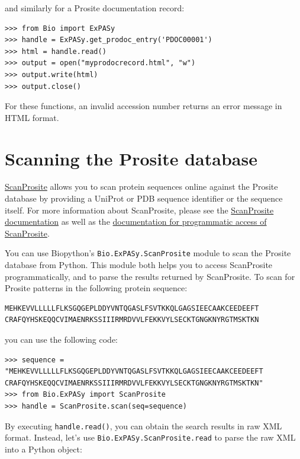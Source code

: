 \documentclass{report}
\begin{document}
and similarly for a Prosite documentation record:

\begin{verbatim}
>>> from Bio import ExPASy
>>> handle = ExPASy.get_prodoc_entry('PDOC00001')
>>> html = handle.read()
>>> output = open("myprodocrecord.html", "w")
>>> output.write(html)
>>> output.close()
\end{verbatim}

For these functions, an invalid accession number returns an error message in HTML format.

\section{Scanning the Prosite database}

\href{http://www.expasy.org/tools/scanprosite/}{ScanProsite} allows you to scan protein sequences online against the Prosite database by providing a UniProt or PDB sequence identifier or the sequence itself. For more information about ScanProsite, please see the \href{http://www.expasy.org/tools/scanprosite/scanprosite-doc.html}{ScanProsite documentation} as well as the \href{http://www.expasy.org/tools/scanprosite/ScanPrositeREST.html}{documentation for programmatic access of ScanProsite}.

You can use Biopython's \verb+Bio.ExPASy.ScanProsite+ module to scan the Prosite database from Python. This module both helps you to access ScanProsite programmatically, and to parse the results returned by ScanProsite. To scan for Prosite patterns in the following protein sequence:

\begin{verbatim}
MEHKEVVLLLLLFLKSGQGEPLDDYVNTQGASLFSVTKKQLGAGSIEECAAKCEEDEEFT
CRAFQYHSKEQQCVIMAENRKSSIIIRMRDVVLFEKKVYLSECKTGNGKNYRGTMSKTKN
\end{verbatim}

you can use the following code:

\begin{verbatim}
>>> sequence = "MEHKEVVLLLLLFLKSGQGEPLDDYVNTQGASLFSVTKKQLGAGSIEECAAKCEEDEEFT
CRAFQYHSKEQQCVIMAENRKSSIIIRMRDVVLFEKKVYLSECKTGNGKNYRGTMSKTKN"
>>> from Bio.ExPASy import ScanProsite
>>> handle = ScanProsite.scan(seq=sequence)
\end{verbatim}

By executing \verb+handle.read()+, you can obtain the search results in raw XML format. Instead, let's use \verb+Bio.ExPASy.ScanProsite.read+ to parse the raw XML into a Python object:
\end{document}
